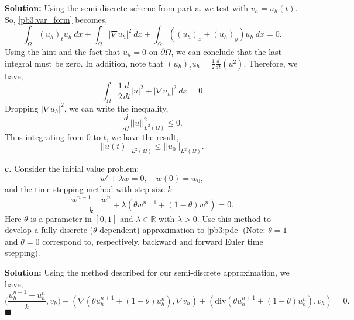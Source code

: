 \documentclass[11pt]{article}
\begin{document}
\vskip 1cm

\textbf{Solution:} Using the semi-discrete scheme from part a. we test with $v_h = u_h(t)$.
So, \eqref{pb3:var_form} becomes,
\begin{equation*}
    \int_\Omega (u_h)_t u_h \: dx + \int_\Omega |\nabla u_h|^2 \: dx + \int_\Omega ((u_h)_x + (u_h)_y) u_h \: dx = 0.
\end{equation*}
Using the hint and the fact that $u_h = 0$ on $\partial \Omega$, we can conclude that the last integral must be zero.
In addition, note that $(u_h)_t u_h = \frac{1}{2}\frac{d}{dt}(u^2)$.
Therefore, we have,
\begin{equation*}
    \int_\Omega \frac{1}{2} \frac{d}{dt}|u|^2 + |\nabla u_h|^2 \: dx = 0
\end{equation*}
Dropping $|\nabla u_h|^2$, we can write the inequality,
\begin{equation*}
    \frac{d}{dt}||u||^2_{L^2(\Omega)} \leq 0.
\end{equation*}
Thus integrating from 0 to $t$, we have the result,
\begin{equation*}
    ||u(t)||_{L^2(\Omega)} \leq ||u_0||_{L^2(\Omega)}.
\end{equation*}


\vskip 2cm



\textbf{c.} Consider the initial value problem:
\begin{equation}
    w' + \lambda w = 0, \quad w(0) = w_0,
\end{equation}
and the time stepping method with step size $k$:
\begin{equation}
    \frac{w^{n+1} - w^n}{k} + \lambda(\theta w^{n+1} + (1-\theta) w^n) = 0.
\end{equation}
Here $\theta$ is a parameter in $[0,1]$ and $\lambda \in \mathbb{R}$ with $\lambda > 0$.
Use this method to develop a fully discrete ($\theta$ dependent) approximation to \eqref{pb3:pde} (Note: $\theta = 1$ and $\theta = 0$ correspond to, respectively, backward and forward Euler time stepping).


\vskip 1cm

\textbf{Solution:} Using the method described for our semi-discrete approximation, we have,
\begin{equation*}
    \big( \frac{u^{n+1}_h - u^n_h}{k}, v_h \big) + (\nabla (\theta u^{n+1}_h + (1 - \theta)u^n_h), \nabla v_h ) + (\text{div}(\theta u^{n+1}_h + (1-\theta)u^n_h), v_h) = 0.
\end{equation*}
$\blacksquare$
\end{document}
